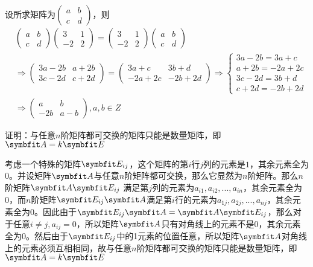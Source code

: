 \begin{solution}
    设所求矩阵为$\begin{pmatrix}a&b\\c&d\end{pmatrix}$，则
    \begin{align*}
    &\begin{pmatrix}a&b\\c&d\end{pmatrix}\begin{pmatrix}3&1\\-2&2\end{pmatrix}=\begin{pmatrix}3&1\\-2&2\end{pmatrix}\begin{pmatrix}a&b\\c&d\end{pmatrix}\\
    &\Rightarrow \begin{pmatrix}3a-2b&a+2b\\3c-2d&c+2d\end{pmatrix}=\begin{pmatrix}3a+c&3b+d\\-2a+2c&-2b+2d\end{pmatrix}\Rightarrow 
    \begin{cases}3a-2b=3a+c\\a+2b=-2a+2c\\3c-2d=3b+d\\c+2d=-2b+2d\end{cases}\\
    &\Rightarrow \begin{pmatrix}a&b\\-2b&a-b\end{pmatrix},a,b\in Z\end{align*}\end{solution}
\begin{example}{}{}
    证明：与任意$n$阶矩阵都可交换的矩阵只能是数量矩阵，即$\bv{A}=k\bv{E}$
\end{example}
\begin{solution}
    考虑一个特殊的矩阵$\bv{E_{ij}}$，这个矩阵的第$i$行$j$列的元素是$1$，其余元素全为$0$。并设矩阵$\bv{A}$与任意$n$阶矩阵都可交换，那么它显然为$n$阶矩阵。那么$n$阶矩阵$\bv{A}\bv{E_{ij}}$ 满足第$j$列的元素为$a_{i1},a_{i2},...,a_{in}$，其余元素全为0，而$n$阶矩阵$\bv{E_{ij}}\bv{A}$满足第$i$行的元素为$a_{1j},a_{2j},...,a_{nj}$，其余元素全为0。因此由于$\bv{E_{ij}}\bv{A}=\bv{A}\bv{E_{ij}}$，那么对于任意$i\ne j,a_{ij}=0$，所以矩阵$\bv{A}$只有对角线上的元素不是0，其余元素全为0。然后由于$\bv{E_{ij}}$中的1元素的位置任意，所以矩阵$\bv{A}$对角线上的元素必须互相相同，故与任意$n$阶矩阵都可交换的矩阵只能是数量矩阵，即$\bv{A}=k\bv{E}$
\end{solution}
